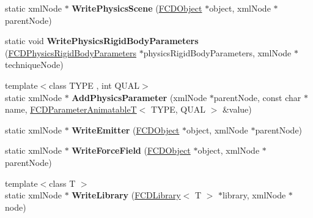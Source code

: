 \begin{DoxyCompactItemize}
\item 
\hypertarget{classFArchiveXML_a15f11f679910779a3c6210444fe66c5c}{
static xmlNode $\ast$ {\bfseries WritePhysicsScene} (\hyperlink{classFCDObject}{FCDObject} $\ast$object, xmlNode $\ast$parentNode)}
\label{classFArchiveXML_a15f11f679910779a3c6210444fe66c5c}

\item 
\hypertarget{classFArchiveXML_a05898e1765f3ff98dbe0d4c35cd960c5}{
static void {\bfseries WritePhysicsRigidBodyParameters} (\hyperlink{classFCDPhysicsRigidBodyParameters}{FCDPhysicsRigidBodyParameters} $\ast$physicsRigidBodyParameters, xmlNode $\ast$techniqueNode)}
\label{classFArchiveXML_a05898e1765f3ff98dbe0d4c35cd960c5}

\item 
\hypertarget{classFArchiveXML_a4d9c42167dff390182688c8b0b553693}{
{\footnotesize template$<$class TYPE , int QUAL$>$ }\\static xmlNode $\ast$ {\bfseries AddPhysicsParameter} (xmlNode $\ast$parentNode, const char $\ast$name, \hyperlink{classFCDParameterAnimatableT}{FCDParameterAnimatableT}$<$ TYPE, QUAL $>$ \&value)}
\label{classFArchiveXML_a4d9c42167dff390182688c8b0b553693}

\item 
\hypertarget{classFArchiveXML_ab2fc171640ac284e1a8ccb82bfb4c93e}{
static xmlNode $\ast$ {\bfseries WriteEmitter} (\hyperlink{classFCDObject}{FCDObject} $\ast$object, xmlNode $\ast$parentNode)}
\label{classFArchiveXML_ab2fc171640ac284e1a8ccb82bfb4c93e}

\item 
\hypertarget{classFArchiveXML_a81561f5cb4769c862a0ba58d5f17dfa3}{
static xmlNode $\ast$ {\bfseries WriteForceField} (\hyperlink{classFCDObject}{FCDObject} $\ast$object, xmlNode $\ast$parentNode)}
\label{classFArchiveXML_a81561f5cb4769c862a0ba58d5f17dfa3}

\item 
\hypertarget{classFArchiveXML_adc1373f3352980407c75d9a8e81d026d}{
{\footnotesize template$<$class T $>$ }\\static xmlNode $\ast$ {\bfseries WriteLibrary} (\hyperlink{classFCDLibrary}{FCDLibrary}$<$ T $>$ $\ast$library, xmlNode $\ast$node)}
\label{classFArchiveXML_adc1373f3352980407c75d9a8e81d026d}

\end{DoxyCompactItemize}


